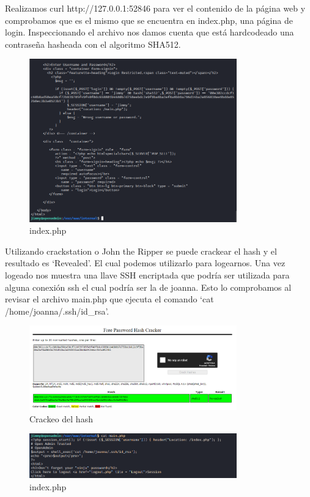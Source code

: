 \documentclass{article}
\begin{document}
Realizamos curl http://127.0.0.1:52846 para ver el contenido de la página web y comprobamos que es el mismo que se encuentra en index.php, una página de login. Inspeccionando el archivo nos damos cuenta que está hardcodeado una contraseña hasheada con el algoritmo SHA512. 
\begin{figure}[H]
	\center
	\includegraphics[width=0.8\textwidth]{images/openadmin/12-indexphp.png}
	\caption{index.php}
\end{figure}

Utilizando crackstation o John the Ripper se puede crackear el hash y el resultado es `Revealed'. El cual podemos utilizarlo para logearnos. Una vez logeado nos muestra una llave SSH encriptada que podría ser utilizada para alguna conexión ssh el cual podría ser la de joanna. Esto lo comprobamos al revisar el archivo main.php que ejecuta el comando `cat /home/joanna/.ssh/id\_rsa'.
\begin{figure}[H]
	\center
	\includegraphics[width=0.8\textwidth]{images/openadmin/13-crackstation.png}
	\caption{Crackeo del hash}
\end{figure}

\begin{figure}[H]
	\center
	\includegraphics[width=0.8\textwidth]{images/openadmin/14-mainphp.png}
	\caption{index.php}
\end{figure}
\end{document}
